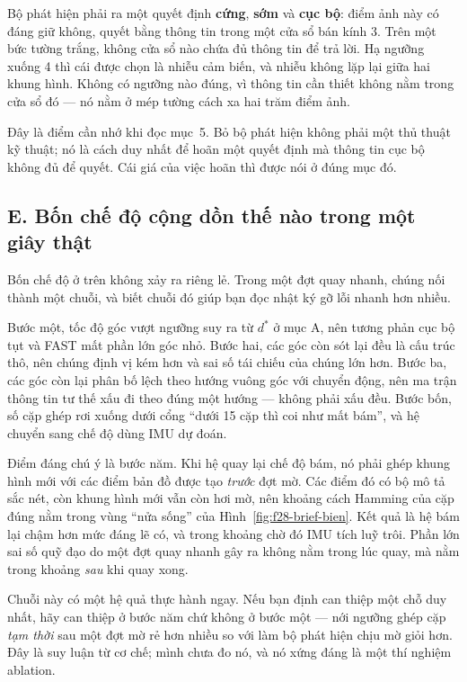 \documentclass[../../deep_learning.tex]{subfiles}
\begin{document}
Bộ phát hiện phải ra một quyết định \textbf{cứng}, \textbf{sớm} và \textbf{cục bộ}: điểm ảnh này có đáng giữ không, quyết bằng thông tin trong một cửa sổ bán kính 3. Trên một bức tường trắng, không cửa sổ nào chứa đủ thông tin để trả lời. Hạ ngưỡng xuống 4 thì cái được chọn là nhiễu cảm biến, và nhiễu không lặp lại giữa hai khung hình. Không có ngưỡng nào đúng, vì thông tin cần thiết không nằm trong cửa sổ đó --- nó nằm ở mép tường cách xa hai trăm điểm ảnh.

Đây là điểm cần nhớ khi đọc mục~5. Bỏ bộ phát hiện không phải một thủ thuật kỹ thuật; nó là cách duy nhất để hoãn một quyết định mà thông tin cục bộ không đủ để quyết. Cái giá của việc hoãn thì được nói ở đúng mục đó.

\subsection{E. Bốn chế độ cộng dồn thế nào trong một giây thật}
Bốn chế độ ở trên không xảy ra riêng lẻ. Trong một đợt quay nhanh, chúng nối thành một chuỗi, và biết chuỗi đó giúp bạn đọc nhật ký gỡ lỗi nhanh hơn nhiều.

Bước một, tốc độ góc vượt ngưỡng suy ra từ \(d^{*}\) ở mục A, nên tương phản cục bộ tụt và FAST mất phần lớn góc nhỏ. Bước hai, các góc còn sót lại đều là cấu trúc thô, nên chúng định vị kém hơn và sai số tái chiếu của chúng lớn hơn. Bước ba, các góc còn lại phân bố lệch theo hướng vuông góc với chuyển động, nên ma trận thông tin tư thế xấu đi theo đúng một hướng --- không phải xấu đều. Bước bốn, số cặp ghép rơi xuống dưới cổng ``dưới 15 cặp thì coi như mất bám'', và hệ chuyển sang chế độ dùng IMU dự đoán.

Điểm đáng chú ý là bước năm. Khi hệ quay lại chế độ bám, nó phải ghép khung hình mới với các điểm bản đồ được tạo \emph{trước} đợt mờ. Các điểm đó có bộ mô tả sắc nét, còn khung hình mới vẫn còn hơi mờ, nên khoảng cách Hamming của cặp đúng nằm trong vùng ``nửa sống'' của Hình~\ref{fig:f28-brief-bien}. Kết quả là hệ bám lại chậm hơn mức đáng lẽ có, và trong khoảng chờ đó IMU tích luỹ trôi. Phần lớn sai số quỹ đạo do một đợt quay nhanh gây ra không nằm trong lúc quay, mà nằm trong khoảng \emph{sau} khi quay xong.

Chuỗi này có một hệ quả thực hành ngay. Nếu bạn định can thiệp một chỗ duy nhất, hãy can thiệp ở bước năm chứ không ở bước một --- nới ngưỡng ghép cặp \emph{tạm thời} sau một đợt mờ rẻ hơn nhiều so với làm bộ phát hiện chịu mờ giỏi hơn. Đây là suy luận từ cơ chế; mình chưa đo nó, và nó xứng đáng là một thí nghiệm ablation.
\end{document}

